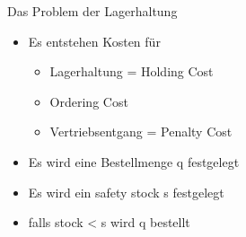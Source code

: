 \begin{frame}{Das Problem der Lagerhaltung}
\begin{itemize}
  \item Es entstehen Kosten für
  \begin{itemize}
  	\item Lagerhaltung = Holding Cost
  	\item Ordering Cost
  	\item Vertriebsentgang = Penalty Cost
  \end{itemize}
  \item Es wird eine Bestellmenge q festgelegt
  \item Es wird ein safety stock s festgelegt
  \item falls stock < s wird q bestellt
\end{itemize}
\end{frame}

